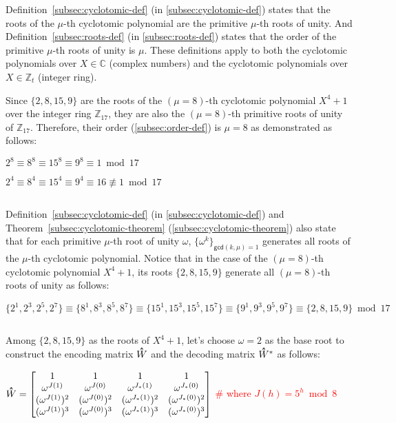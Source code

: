 $ $

Definition~\ref*{subsec:cyclotomic-def} (in \autoref{subsec:cyclotomic-def}) states that the roots of the $\mu$-th cyclotomic polynomial are the primitive $\mu$-th roots of unity. And Definition~\ref*{subsec:roots-def} (in \autoref{subsec:roots-def}) states that the order of the primitive $\mu$-th roots of unity is $\mu$. These definitions apply to both the cyclotomic polynomials over $X\in\mathbb{C}$ (complex numbers) and the cyclotomic polynomials over $X \in \mathbb{Z}_t$ (integer ring). 

Since $\{2, 8, 15, 9\}$ are the roots of the $(\mu=8)$-th cyclotomic polynomial $X^4 + 1$ over the integer ring $\mathbb{Z}_{17}$, they are also the $(\mu=8)$-th primitive roots of unity of $\mathbb{Z}_{17}$. Therefore, their order (\autoref{subsec:order-def}) is $\mu=8$ as demonstrated as follows: 

$2^8 \equiv 8^8 \equiv 15^8 \equiv 9^8 \equiv 1 \bmod 17$

$2^4 \equiv 8^4 \equiv 15^4 \equiv 9^4 \equiv 16 \not\equiv 1 \bmod 17$

$ $

Definition~\ref*{subsec:cyclotomic-def} (in \autoref{subsec:cyclotomic-def}) and Theorem~\ref*{subsec:cyclotomic-theorem} (\autoref{subsec:cyclotomic-theorem}) also state that for each primitive $\mu$-th root of unity $\omega$, $\{\omega^k\}_{\textsf{gcd}(k, \mu) = 1}$ generates all roots of the $\mu$-th cyclotomic polynomial. Notice that in the case of the $(\mu=8)$-th cyclotomic polynomial $X^4 + 1$, its roots $\{2, 8, 15, 9\}$ generate all $(\mu=8)$-th roots of unity as follows:

$\{2^1, 2^3, 2^5, 2^7\} \equiv \{8^1, 8^3, 8^5, 8^7\} \equiv \{15^1, 15^3, 15^5, 15^7\} \equiv \{9^1, 9^3, 9^5, 9^7\} \equiv \{2, 8, 15, 9\} \bmod 17$

$ $

Among $\{2, 8, 15, 9\}$ as the roots of $X^4 + 1$, let's choose $\omega = 2$ as the base root to construct the encoding matrix $\hathat{W}$ and the decoding matrix $\hathat{W}^*$ as follows: 

$\hathat{W} = \begin{bmatrix}
1 & 1 & 1 & 1\\
\omega^{J(1)} & \omega^{J(0)} & \omega^{J_*(1)} & \omega^{J_*(0)}\\
(\omega^{J(1)})^2 & (\omega^{J(0)})^2 & (\omega^{J_*(1)})^2 & (\omega^{J_*(0)})^2\\
(\omega^{J(1)})^3 & (\omega^{J(0)})^3 & (\omega^{J_*(1)})^3 & (\omega^{J_*(0)})^3\\
\end{bmatrix}$ \textcolor{red}{\text{ } \# where $J(h) = 5^h \bmod 8$}

